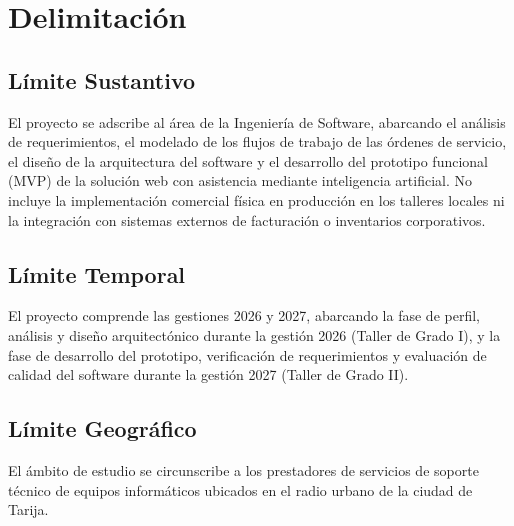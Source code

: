 \section{Delimitación}

\subsection{Límite Sustantivo}

El proyecto se adscribe al área de la Ingeniería de Software, abarcando el análisis de requerimientos, el modelado de los flujos de trabajo de las órdenes de servicio, el diseño de la arquitectura del software y el desarrollo del prototipo funcional (MVP) de la solución web con asistencia mediante inteligencia artificial. No incluye la implementación comercial física en producción en los talleres locales ni la integración con sistemas externos de facturación o inventarios corporativos.

\subsection{Límite Temporal}

El proyecto comprende las gestiones 2026 y 2027, abarcando la fase de perfil, análisis y diseño arquitectónico durante la gestión 2026 (Taller de Grado I), y la fase de desarrollo del prototipo, verificación de requerimientos y evaluación de calidad del software durante la gestión 2027 (Taller de Grado II).

\subsection{Límite Geográfico}

El ámbito de estudio se circunscribe a los prestadores de servicios de soporte técnico de equipos informáticos ubicados en el radio urbano de la ciudad de Tarija.